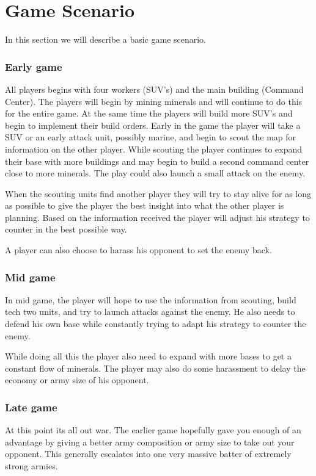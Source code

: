 \section{Game Scenario}
	In this section we will describe a basic game scenario.
	
	\subsubsection{Early game}
		All players begins with four workers (SUV's) and the main building (Command Center).	The players will begin by mining minerals and will continue to do this for the entire game. At the same time the players will build more SUV's and begin to implement their build orders. 			Early in the game the player will take a SUV or an early attack unit, possibly marine, and begin to scout the map for information on the other player. 
		While scouting the player continues to expand their base with more buildings and may begin to build a second command center close to more minerals. The play could also launch a small attack on the enemy.
		
		When the scouting units find another player they will try to stay alive for as long as possible to give the player the best insight into what the other player is planning. Based on the information received the player will adjust his strategy to counter in the best possible way.
		
		A player can also choose to harass his opponent to set the enemy back.
		
	\subsubsection{Mid game}
		In mid game, the player will hope to use the information from scouting, build tech two units, and try to launch attacks against the enemy. He also needs to defend his own base while constantly trying to adapt his strategy to counter the enemy.
		
		While doing all this the player also need to expand with more bases to get a constant flow of minerals. The player may also do some harassment to delay the economy or army size of his opponent.
		
	\subsubsection{Late game}
		At this point its all out war. The earlier game hopefully gave you enough of an advantage by giving a better army composition or army size to take out your opponent. This generally escalates into one very massive batter of extremely strong armies.
